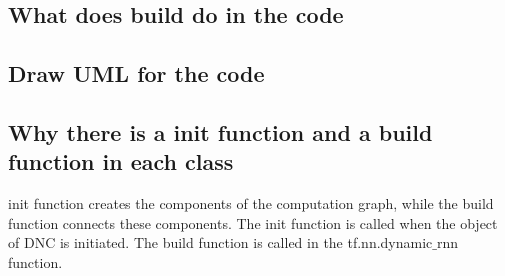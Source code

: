 \documentclass{article}
\begin{document}
\subsection{What does build do in the code}
\subsection{Draw UML for the code}
\subsection{Why there is a init function and a build function in each class}
init function creates the components of the computation graph, while the build function connects these components. The init function is called when the object of DNC is initiated. The build function is called in the tf.nn.dynamic$\_$rnn function.
\end{document}
